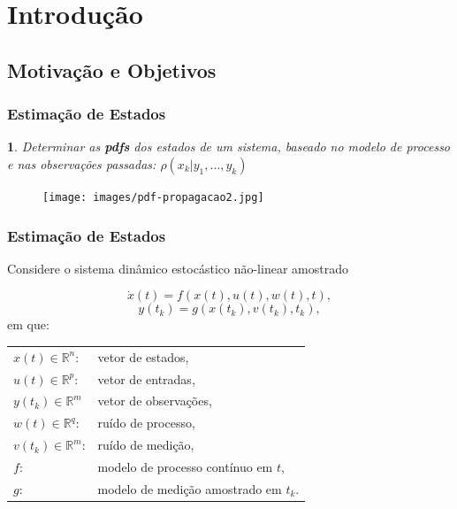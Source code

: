 \documentclass{beamer}
\renewcommand{\(}{\left(}
\renewcommand{\)}{\right)}
\renewcommand{\[}{\left[}
\renewcommand{\]}{\right]}
\newtheorem{definicao}{}
\begin{document}

\section{Introdução} 

\subsection{Motivação e Objetivos} 


\begin{frame}
	\frametitle{Estimação de Estados}
	\begin{definicao}
		Determinar as \textbf{pdfs} dos estados de um sistema, baseado no modelo de processo e nas observações passadas: $\rho(x_k | y_1,...,y_k)$ \\
	\end{definicao}
	
	\begin{figure}
		\centering
		\texttt{[image: images/pdf-propagacao2.jpg]}
	\end{figure}

\end{frame}


\begin{frame}
\frametitle{Estimação de Estados}
Considere o sistema dinâmico estocástico não-linear amostrado

\begin{equation*}\label{eq:processo}
\dot{x}(t)=f(x(t),u(t),w(t),t),
\end{equation*}
\begin{equation*}\label{eq:obs}
y(t_k)=g(x(t_k),v(t_k),t_k),
\end{equation*}
\vspace{0.3cm}
em que:
\vspace{0.4cm}

\begin{tabular}{l l}
	\hfill
	$x(t) \in \mathbb{R}^n$:  	& vetor de estados, \\
	\hfill
	$u(t) \in \mathbb{R}^p$:  	& vetor de entradas, \\
	\hfill
	$y(t_k) \in \mathbb{R}^m$ 	& vetor de observações, \\
	\hfill
	$w(t) \in \mathbb{R}^q$:	 	& ruído de processo, \\
	\hfill
	$v(t_k) \in \mathbb{R}^m$: 	& ruído de medição, \\
	\hfill
	$f$: 		& modelo de processo contínuo em $t$, \\
	\hfill
	$g$:  	 	& modelo de medição amostrado em $t_k$.
\end{tabular}

\end{frame}
\end{document}
